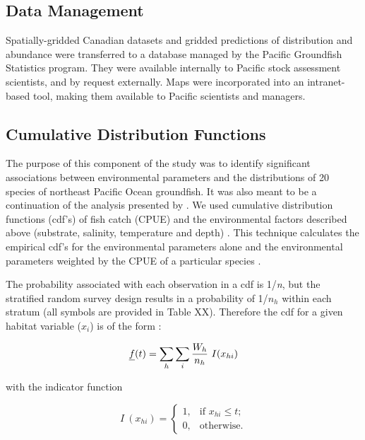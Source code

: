 \documentclass[11pt]{book}\usepackage[]{graphicx}\usepackage[]{color}
\begin{document}
\subsection{Data Management}
Spatially-gridded Canadian datasets and gridded predictions of distribution and abundance were transferred to a database managed by the Pacific Groundfish Statistics program. They were available internally to Pacific stock assessment scientists, and by request externally. Maps were incorporated into an intranet-based tool, making them available to Pacific scientists and managers.

\subsection{Cumulative Distribution Functions}
The purpose of this component of the study was to identify significant associations between environmental parameters and the distributions of 20 species of northeast Pacific Ocean groundfish. It was also meant to be a continuation of the analysis presented by \citet{psf94}. We used cumulative distribution functions (cdf's) of fish catch (CPUE) and the  environmental factors described above (substrate, salinity, temperature and depth) \citep{ps94, psf94}. This technique calculates the empirical cdf's for the environmental parameters alone and the environmental parameters weighted by the CPUE of a particular species \citep{ps94, psf94}. 

The probability associated with each observation in a cdf is 1/\emph{n}, but the stratified random survey design results in a probability of 1/$n_{h}$ within each stratum (all symbols are provided in Table XX). Therefore the cdf for a given habitat variable ($x_{i}$) is of the form \citep{cd86}:

\begin{equation}
\label{eq:cdf1}
\emph{f}(t) = \sum_{h}\sum_{i}\frac{W_h}{n_h}~I({x_{hi}}) %
\end{equation}

with the indicator function

\begin{equation*}  %
{I}~({x_{hi}})=\begin{cases}
1,& \text{if $x_{hi}$}\leq t;\\    %
0,& \text{otherwise}.
\end{cases}
\end{equation*}
\end{document}
